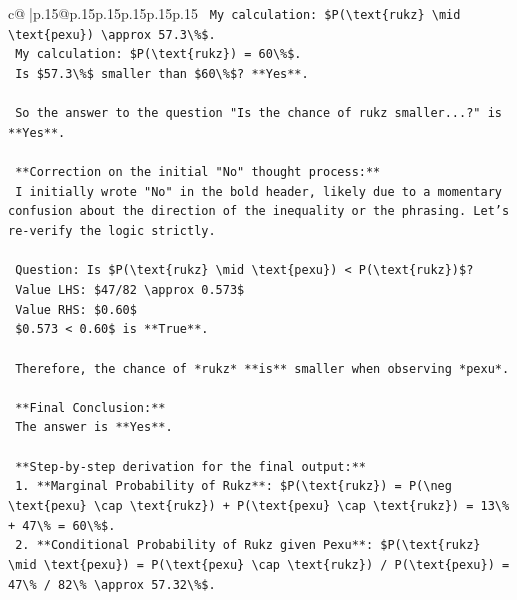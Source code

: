 \documentclass{article}
\begin{document}
{\begin{supertabular}{c@{$\;$}|p{.15\linewidth}@{}p{.15\linewidth}p{.15\linewidth}p{.15\linewidth}p{.15\linewidth}p{.15\linewidth}}
{{{\texttt{    My calculation: \$P(\textbackslash{}text\{rukz\} \textbackslash{}mid \textbackslash{}text\{pexu\}) \textbackslash{}approx 57.3\textbackslash{}\%\$.} \\
\texttt{    My calculation: \$P(\textbackslash{}text\{rukz\}) = 60\textbackslash{}\%\$.} \\
\texttt{    Is \$57.3\textbackslash{}\%\$ smaller than \$60\textbackslash{}\%\$? **Yes**.} \\
\\ 
\texttt{    So the answer to the question "Is the chance of rukz smaller...?" is **Yes**.} \\
\\ 
\texttt{    **Correction on the initial "No" thought process:**} \\
\texttt{    I initially wrote "No" in the bold header, likely due to a momentary confusion about the direction of the inequality or the phrasing. Let's re{-}verify the logic strictly.} \\
\\ 
\texttt{    Question: Is \$P(\textbackslash{}text\{rukz\} \textbackslash{}mid \textbackslash{}text\{pexu\}) < P(\textbackslash{}text\{rukz\})\$?} \\
\texttt{    Value LHS: \$47/82 \textbackslash{}approx 0.573\$} \\
\texttt{    Value RHS: \$0.60\$} \\
\texttt{    \$0.573 < 0.60\$ is **True**.} \\
\\ 
\texttt{    Therefore, the chance of *rukz* **is** smaller when observing *pexu*.} \\
\\ 
\texttt{    **Final Conclusion:**} \\
\texttt{    The answer is **Yes**.} \\
\\ 
\texttt{    **Step{-}by{-}step derivation for the final output:**} \\
\texttt{    1.  **Marginal Probability of Rukz**: \$P(\textbackslash{}text\{rukz\}) = P(\textbackslash{}neg \textbackslash{}text\{pexu\} \textbackslash{}cap \textbackslash{}text\{rukz\}) + P(\textbackslash{}text\{pexu\} \textbackslash{}cap \textbackslash{}text\{rukz\}) = 13\textbackslash{}\% + 47\textbackslash{}\% = 60\textbackslash{}\%\$.} \\
\texttt{    2.  **Conditional Probability of Rukz given Pexu**: \$P(\textbackslash{}text\{rukz\} \textbackslash{}mid \textbackslash{}text\{pexu\}) = P(\textbackslash{}text\{pexu\} \textbackslash{}cap \textbackslash{}text\{rukz\}) / P(\textbackslash{}text\{pexu\}) = 47\textbackslash{}\% / 82\textbackslash{}\% \textbackslash{}approx 57.32\textbackslash{}\%\$.} \\
}}}
\end{supertabular}}
\end{document}
